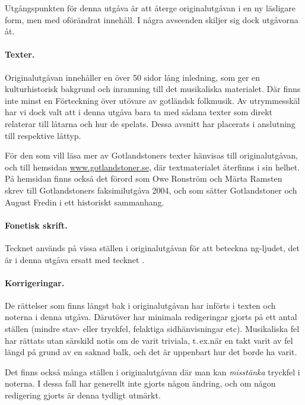 {\makeatother

Utgångspunkten för denna utgåva är att återge originalutgåvan i en ny läsligare
form, men med oförändrat innehåll. I några avseenden skiljer sig dock utgåvorna åt.

\paragraph{Texter.} Originalutgåvan innehåller en över 50 sidor lång inledning,
som ger en kulturhistorisk bakgrund och inramning till det musikaliska materialet.
Där finns inte minst en \guillemotright{}Förteckning över utövare av gotländsk
folkmusik\guillemotright{}.
Av utrymmesskäl har vi dock valt att i denna utgåva bara ta med sådana texter
som direkt relaterar till låtarna och hur de spelats. Dessa avsnitt
har placerats i anslutning till respektive låttyp.

För den som vill läsa mer av Gotlandstoners texter hänvisas till originalutgåvan,
och till hemsidan \href{http://www.gotlandstoner.se/}{www.gotlandstoner.se}, där textmaterialet återfinns i sin helhet.
På hemsidan finns också det förord som Owe Ronström och
Märta Ramsten skrev till Gotlandstoners faksimilutgåva 2004, och som
sätter Gotlandstoner och August Fredin i ett historiskt sammanhang.

\paragraph{Fonetisk skrift.} Tecknet  används
på vissa ställen i originalutgåvan för att beteckna ng-ljudet, det är i denna utgåva ersatt med tecknet \ng{}.

\paragraph{Korrigeringar.} De rättelser som finns längst bak i originalutgåvan har
införts i texten och noterna i denna utgåva. Därutöver har minimala redigeringar
gjorts på ett antal ställen (mindre stav- eller tryckfel, felaktiga sidhänvisningar etc).
\guillemotright{}Musikaliska fel\guillemotright{} har rättats utan särskild notis
om de varit \guillemotright{}triviala\guillemotright{}, t.\,ex.\@ när en takt
varit av fel längd på grund av en saknad balk, och det är uppenbart hur det borde ha varit.

Det finns också många ställen i originalutgåvan där man kan \textit{misstänka}
tryckfel i noterna. I dessa fall har generellt inte gjorts någon ändring, och
om någon redigering gjorts är denna tydligt utmärkt.

}
